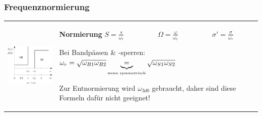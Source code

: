 \subsubsection{Frequenznormierung }
\begin{tabular}{ll}
\parbox{6cm}{
	\includegraphics[width=5cm]{./images/filter-freqnormierung.png}}
& \parbox{12cm}{
	\textbf{Normierung} \\
	$S=\frac{s}{\omega_{r}} \hspace{2cm} \Omega=\frac{\omega}{\omega_{r}} 
\hspace{2cm} \sigma'=\frac{\sigma}{\omega_{r}}$\\ 

	Bei Bandpässen \& -sperren: $\omega_r = \sqrt{\omega_{B1} \omega_{B2}}
	\underbrace{=}_{\text{\tiny{wenn symmetrisch}}} \sqrt{\omega_{S1} \omega_{S2}}$
	\\

	Zur Entnormierung wird $\omega_{3db}$ gebraucht, daher sind diese Formeln
	dafür nicht geeignet! \\
	}
\end{tabular}


